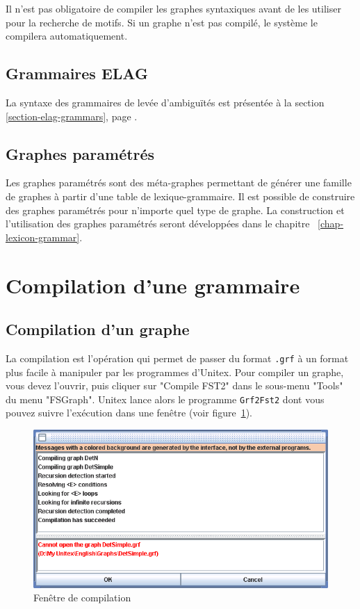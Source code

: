 \bigskip
\noindent Il n’est pas obligatoire de compiler les graphes syntaxiques avant de les utiliser pour la
recherche de motifs. Si un graphe n’est pas compilé, le système le compilera automatiquement.


\subsection{Grammaires ELAG}

La syntaxe des grammaires de levée d’ambiguïtés est présentée à la section \ref{section-elag-grammars},
page \pageref{section-elag-grammars}.


\subsection{Graphes paramétrés}
Les graphes paramétrés sont des méta-graphes permettant de générer une famille de
graphes à partir d’une table de lexique-grammaire. Il est possible de construire des graphes
paramétrés pour n’importe quel type de graphe. La construction et l’utilisation des graphes
paramétrés seront développées dans le chapitre
~\ref{chap-lexicon-grammar}.

\section{Compilation d'une grammaire}
\label{section-graph-compilation}
\subsection{Compilation d'un graphe}
La compilation est l’opération qui permet de passer du format \verb+.grf+ à un format plus
facile à manipuler par les programmes d’Unitex. Pour compiler un graphe, vous devez
l’ouvrir, puis cliquer sur "Compile FST2" dans le sous-menu "Tools" du menu "FSGraph".
Unitex lance alors le programme \verb+Grf2Fst2+ dont vous pouvez suivre l’exécution dans une fenêtre
(voir figure~\ref{fig-compilation-frame}).

\bigskip
\begin{figure}[!ht]
\begin{center}
\includegraphics[width=14.7cm]{resources/img/fig6-4.png}
\caption{Fenêtre de compilation\label{fig-compilation-frame}}
\end{center}
\end{figure}

